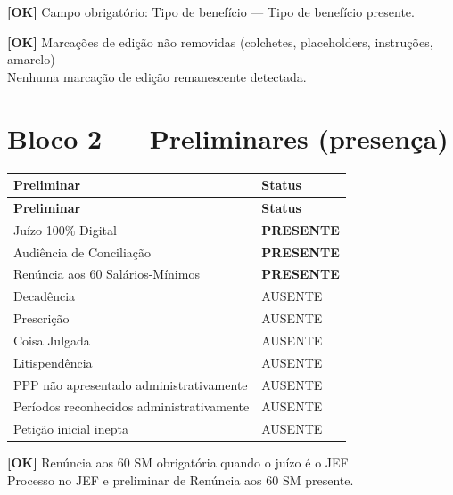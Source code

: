 \documentclass[12pt,a4paper]{article}
\newcommand{\statusOK}[1]{\textcolor{corOK}{\textbf{[OK]}} #1}
\begin{document}
\medskip
\statusOK{Campo obrigatório: Tipo de benefício} --- Tipo de benefício presente.

\medskip
\statusOK{Marcações de edição não removidas (colchetes, placeholders, instruções, amarelo)}\\
Nenhuma marcação de edição remanescente detectada.

\section{Bloco 2 --- Preliminares (presença)}

\begin{longtable}{p{8.5cm} p{4.5cm}}
  \toprule
  \textbf{Preliminar} & \textbf{Status} \\
  \midrule
  \endfirsthead
  \toprule
  \textbf{Preliminar} & \textbf{Status} \\
  \midrule
  \endhead
  Juízo 100\% Digital                         & \textcolor{corOK}{\textbf{PRESENTE}} \\
  Audiência de Conciliação                    & \textcolor{corOK}{\textbf{PRESENTE}} \\
  Renúncia aos 60 Salários-Mínimos            & \textcolor{corOK}{\textbf{PRESENTE}} \\
  Decadência                                  & AUSENTE \\
  Prescrição                                  & AUSENTE \\
  Coisa Julgada                               & AUSENTE \\
  Litispendência                              & AUSENTE \\
  PPP não apresentado administrativamente     & AUSENTE \\
  Períodos reconhecidos administrativamente   & AUSENTE \\
  Petição inicial inepta                      & AUSENTE \\
  \bottomrule
\end{longtable}

\statusOK{Renúncia aos 60 SM obrigatória quando o juízo é o JEF}\\
Processo no JEF e preliminar de Renúncia aos 60 SM presente.

\end{document}
